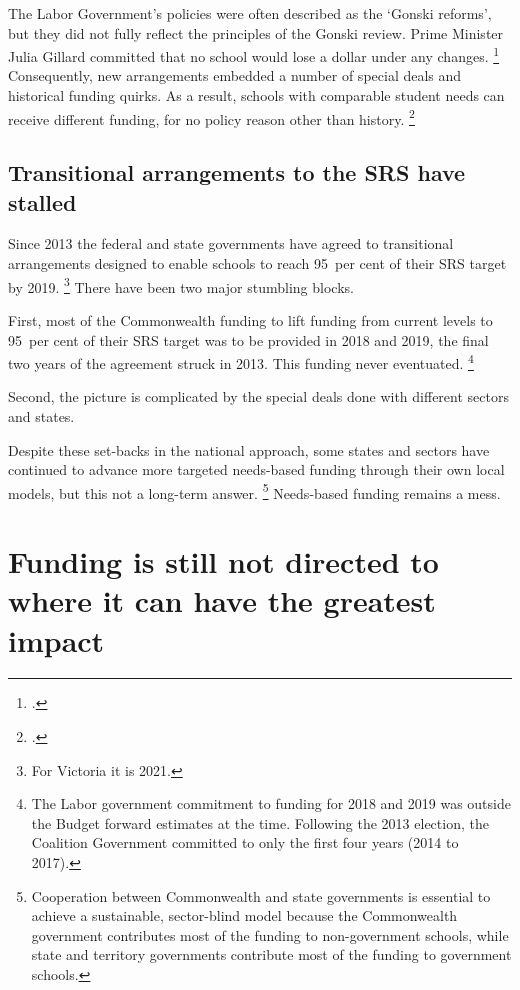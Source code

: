 \documentclass{grattan}
\begin{document}
The Labor Government's policies were often described as the `Gonski reforms', but they did not fully reflect the principles of the Gonski review. Prime Minister Julia Gillard committed that no school would lose a dollar under any changes.%
\footcite[][xxi]{Gonski2011ReviewFundingSchooling}
Consequently, new arrangements embedded a number of special deals and historical funding quirks. As a result, schools with comparable student needs can receive different funding, for no policy reason other than history.%
\footcite{Gallash2013SecretGonskiDeals}

\subsection{Transitional arrangements to the SRS have stalled }\label{subsec:transitional-arrangements-to-the-srs-have-stalled}

Since 2013 the federal and state governments have agreed to transitional arrangements designed to enable schools to reach 95~per cent of their SRS target by 2019.%
\footnote{For Victoria it is 2021.} %
There have been two major stumbling blocks.

First, most of the Commonwealth funding to lift funding from current levels to 95~per cent of their SRS target was to be provided in 2018 and 2019, the final two years of the agreement struck in 2013.
This funding never eventuated.%
\footnote{The Labor government commitment to funding for 2018 and 2019 was outside the Budget forward estimates at the time.
Following the 2013 election, the Coalition Government committed to only the first four years (2014 to 2017).}

Second, the picture is complicated by the special deals done with different sectors and states.

Despite these set-backs in the national approach, some states and sectors have continued to advance more targeted needs-based funding through their own local models, but this not a long-term answer.%
\footnote{Cooperation between Commonwealth and state governments is essential to achieve a sustainable, sector-blind model because the Commonwealth government contributes most of the funding to non-government schools, while state and territory governments contribute most of the funding to government schools.}
Needs-based funding remains a mess.

\section{Funding is still not directed to where it can have the greatest impact}\label{sec:current-situation-funding-is-still-not-directed-to-where-it-can-have-the-greatest-impact}
\end{document}
